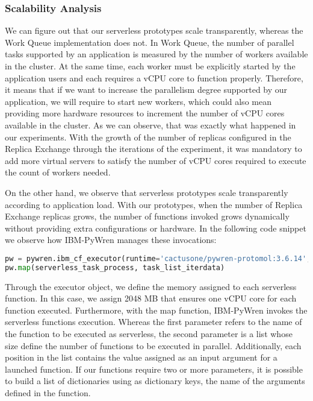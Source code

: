 \documentclass[sigplan, screen]{acmart}
\begin{document}
\subsubsection{Scalability Analysis}
We can figure out that our serverless prototypes scale transparently, whereas the Work Queue implementation does not. In Work Queue, the number of parallel tasks supported by an application is measured by the number of workers available in the cluster. At the same time, each worker must be explicitly started by the application users and each requires a vCPU core to function properly. Therefore, it means that if we want to increase the parallelism degree supported by our application, we will require to start new workers, which could also mean providing more hardware resources to increment the number of vCPU cores available in the cluster. As we can observe, that was exactly what happened in our experiments. With the growth of the number of replicas configured in the Replica Exchange through the iterations of the experiment, it was mandatory to add more virtual servers to satisfy the number of  vCPU cores required to execute the count of workers needed.

On the other hand, we observe that serverless prototypes scale transparently according to application load. With our prototypes, when the number of Replica Exchange replicas grows, the number of functions invoked grows dynamically without providing extra configurations or hardware. In the following code snippet we observe how IBM-PyWren manages these invocations:

\lstset{style=mystyle}
\begin{lstlisting}[language=Python]
pw = pywren.ibm_cf_executor(runtime='cactusone/pywren-protomol:3.6.14', runtime_memory=2048)
pw.map(serverless_task_process, task_list_iterdata)

\end{lstlisting}

Through the executor object, we define the memory assigned to each serverless function. In this case, we assign 2048 MB that ensures one vCPU core for each function executed. Furthermore, with the map function, IBM-PyWren invokes the serverless functions execution. Whereas the first parameter refers to the name of the function to be executed as serverless, the second parameter is a list whose size define the number of functions to be executed in parallel. Additionally, each position in the list contains the value assigned as an input argument for a launched function. If our functions require two or more parameters, it is possible to build a list of dictionaries using as dictionary keys, the name of the arguments defined in the function.
\end{document}
